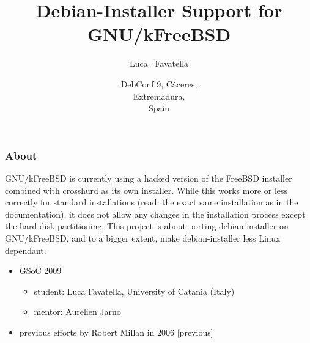 \documentclass{beamer}
\title
{Debian-Installer Support for GNU/kFreeBSD}
\author
{Luca ~Favatella}
\date[Debconf 9] %
{DebConf 9, Cáceres,\\ Extremadura,\\ Spain}
\begin{document}
\begin{frame}
  \titlepage
\end{frame}



\begin{frame}
  \frametitle{About}

  GNU/kFreeBSD is currently using a hacked version of the FreeBSD installer combined with crosshurd as its own installer. While this works more or less correctly for standard installations (read: the exact same installation as in the documentation), it does not allow any changes in the installation process except the hard disk partitioning. This project is about porting debian-installer on GNU/kFreeBSD, and to a bigger extent, make debian-installer less Linux dependant.

  \begin{itemize}
  \item
    GSoC 2009
    \begin{itemize}
    \item
      student: Luca Favatella, University of Catania (Italy)
    \item
      mentor: Aurelien Jarno 
    \end{itemize}
  \item
    previous efforts by Robert Millan in 2006 [previous]
  \end{itemize}

\end{frame}
\end{document}
